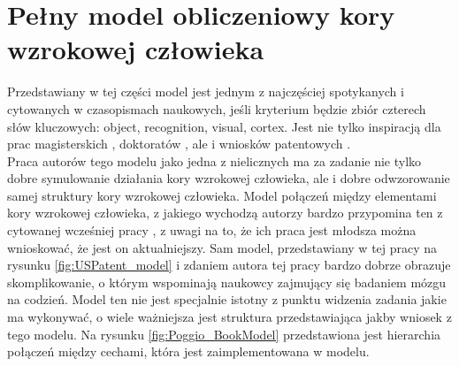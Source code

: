 \section{Pełny model obliczeniowy kory wzrokowej człowieka}
\label{integracjaPOGGIO}


Przedstawiany w tej części model jest jednym z najczęściej spotykanych i cytowanych w czasopismach naukowych, jeśli kryterium będzie zbiór czterech słów kluczowych: object, recognition, visual, cortex. Jest nie tylko inspiracją dla prac magisterskich \cite{Lopez2008}, doktoratów \cite{PHDRiesenhuber2000}, ale i wniosków patentowych \cite{USPatent}.\\

Praca autorów tego modelu jako jedna z nielicznych ma za zadanie nie tylko dobre symulowanie działania kory wzrokowej człowieka, ale i dobre odwzorowanie samej struktury kory wzrokowej człowieka. Model połączeń między elementami kory wzrokowej człowieka, z jakiego wychodzą autorzy bardzo przypomina ten z cytowanej wcześniej pracy \cite{Ungerleider}, z uwagi na to, że ich praca jest młodsza można wnioskować, że jest on aktualniejszy. Sam model, przedstawiany w tej pracy na rysunku \ref{fig:USPatent_model} i zdaniem autora tej pracy bardzo dobrze obrazuje skomplikowanie, o którym wspominają naukowcy zajmujący się badaniem mózgu na codzień. Model ten nie jest specjalnie istotny z punktu widzenia zadania jakie ma wykonywać, o wiele ważniejsza jest struktura przedstawiająca jakby wniosek z tego modelu. Na rysunku \ref{fig:Poggio_BookModel} przedstawiona jest hierarchia połączeń między cechami, która jest zaimplementowana w modelu.\\

